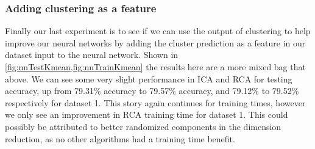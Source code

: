 \documentclass[
letterpaper, %
]{IEEEtran}
\begin{document}
	\subsubsection{Adding clustering as a feature}
	Finally our last experiment is to see if we can use the output of clustering to help improve our neural networks by adding the cluster prediction as a feature in our dataset input to the neural network. Shown in \cref{fig:nnTestKmean,fig:nnTrainKmean} the results here are a more mixed bag that above. We can see some very slight performance in ICA and RCA for testing accuracy, up from 79.31\% accuracy to 79.57\% accuracy, and 79.12\% to 79.52\% respectively for dataset 1. This story again continues for training times, however we only see an improvement in RCA training time for dataset 1. This could possibly be attributed to better randomized components in the dimension reduction, as no other algorithms had a training time benefit.
	
\end{document}
